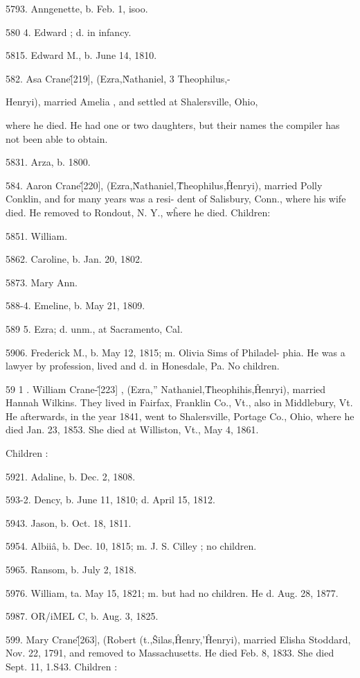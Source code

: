 \documentclass{book}
\begin{document}
5793. Anngenette, b. Feb. 1, isoo. 

580  4. Edward ; d. in infancy. 

5815. Edward M., b. June 14, 1810. 

582. Asa Crane\^ [219], (Ezra,\^ Nathaniel, 3 Theophilus,- 

Henryi), married Amelia , and settled at Shalersville, Ohio, 

where he died. He had one or two daughters, but their names 
the compiler has not been able to obtain. 

5831. Arza, b. 1800. 

584. Aaron Crane\^ [220], (Ezra,\^ Nathaniel,\^ Theophilus,\^ 
Henryi), married Polly Conklin, and for many years was a resi- 
dent of Salisbury, Conn., where his wife died. He removed to 
Rondout, N. Y., w\^here he died. Children: 

5851. William. 

5862. Caroline, b. Jan. 20, 1802. 

5873. Mary Ann. 

588-4. Emeline, b. May 21, 1809. 

589  5. Ezra; d. unm., at Sacramento, Cal. 

5906. Frederick M., b. May 12, 1815; m. Olivia Sims of Philadel- 
phia. He was a lawyer by profession, lived and d. in 
Honesdale, Pa. No children. 

59 1 . William Crane-\^ [223] , (Ezra,'' Nathaniel,\^ Theophihis,\^ 
Henryi), married Hannah Wilkins. They lived in Fairfax, 
Franklin Co., Vt., also in Middlebury, Vt. He afterwards, in 
the year 1841, went to Shalersville, Portage Co., Ohio, where he 
died Jan. 23, 1853. She died at Williston, Vt., May 4, 1861. 

Children : 

5921. Adaline, b. Dec. 2, 1808. 

593-2. Dency, b. June 11, 1810; d. April 15, 1812. 

5943. Jason, b. Oct. 18, 1811. 

5954. Albii\^a, b. Dec. 10, 1815; m. J. S. Cilley ; no children. 

5965. Ransom, b. July 2, 1818. 

5976. William, ta. May 15, 1821; m. but had no children. He d. 
Aug. 28, 1877. 

5987. OR/iMEL C, b. Aug. 3, 1825. 

599. Mary Crane\^ [263], (Robert (t.,\^ Silas,\^ Henry,'\^ 
Henryi), married Elisha Stoddard, Nov. 22, 1791, and removed 
to Massachusetts. He died Feb. 8, 1833. She died Sept. 11, 
1.S43. Children : 
\end{document}
